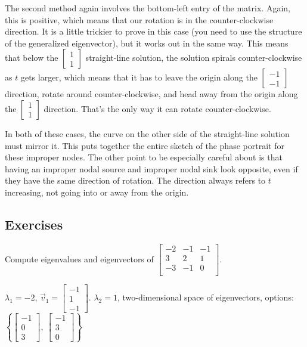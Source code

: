 The second method again involves the bottom-left entry of the matrix. Again, this is positive, which means that our rotation is in the counter-clockwise direction. It is a little trickier to prove in this case (you need to use the structure of the generalized eigenvector), but it works out in the same way. This means that below the $\left[\begin{smallmatrix} 1 \\ 1 \end{smallmatrix}\right]$ straight-line solution, the solution spirals counter-clockwise as $t$ gets larger, which means that it has to leave the origin along the $\left[\begin{smallmatrix} -1 \\ -1 \end{smallmatrix}\right]$ direction, rotate around counter-clockwise, and head away from the origin along the $\left[\begin{smallmatrix} 1 \\ 1 \end{smallmatrix}\right]$ direction. That's the only way it can rotate counter-clockwise. 

In both of these cases, the curve on the other side of the straight-line solution must mirror it. This puts together the entire sketch of the phase portrait for these improper nodes. The other point to be especially careful about is that having an improper nodal source and improper nodal sink look opposite, even if they have the same direction of rotation. The direction always refers to $t$ increasing, not going into or away from the origin. 

\subsection{Exercises}

\begin{exercise}
Compute eigenvalues and eigenvectors of
$\left[ \begin{smallmatrix}
-2 & -1 & -1 \\
3 & 2 & 1 \\
-3 & -1 & 0 \\
\end{smallmatrix} \right]$.
\end{exercise}
\comboSol{%
}
{%
$\lambda_1 = -2$, $\vec{v}_1 = \left[\begin{smallmatrix} -1 \\ 1 \\ -1 \end{smallmatrix}\right]$. $\lambda_2 = 1$, two-dimensional space of eigenvectors, options: $\left\{ \left[\begin{smallmatrix} -1 \\ 0 \\ 3 \end{smallmatrix}\right],\ \left[\begin{smallmatrix} -1 \\ 3 \\ 0 \end{smallmatrix}\right]\right\}$
}

